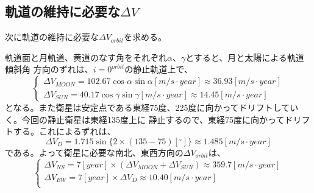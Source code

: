 \documentclass[15pt,uplatex,dvipdfmx]{jsarticle}
\begin{document}
\subsection{軌道の維持に必要な$\Delta V$}
次に軌道の維持に必要な$\Delta V_{orbit}$を求める。\par
軌道面と月軌道、黄道のなす角をそれぞれ$\alpha$、$\gamma$とすると、月と太陽による軌道傾斜角
方向のずれは、$i=0^{orbit}$の静止軌道上で、
\begin{equation}
  \begin{cases}
    \Delta V_{MOON} = 102.67 \cos \alpha \sin \alpha [m/s \cdot year] \approx 36.93[m/s \cdot year] \\
    \Delta V_{SUN} = 40.17 \cos \gamma \sin \gamma [m/s \cdot year] \approx 14.45[m/s \cdot year]
  \end{cases}
\end{equation}
となる。また衛星は安定点である東経75度、225度に向かってドリフトしていく。今回の静止衛星は東経135度上に
静止するので、東経75度に向かってドリフトする。これによるずれは、
\begin{equation}
\Delta V_D = 1.715 \sin \bigl\{ 2 \times (135-75)[^ \circ] \bigr\} \approx 1.485[m/s \cdot year]
\end{equation}
である。よって衛星に必要な南北、東西方向の$\Delta V_{orbit}$は、
\begin{equation}
  \begin{cases}
    \Delta V_{NS} = 7[year] \times (\Delta V_{MOON} + \Delta V_{SUN}) \approx 359.7[m/s \cdot year] \\
    \Delta V_{EW} = 7[year] \times \Delta V_D \approx 10.40[m/s \cdot year] \\
  \end{cases}
\end{equation}
\end{document}
